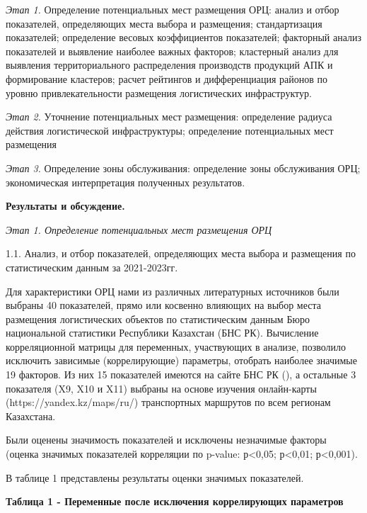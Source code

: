 \emph{Этап 1.} Определение потенциальных мест размещения ОРЦ: анализ и
отбор показателей, определяющих места выбора и размещения;
стандартизация показателей; определение весовых коэффициентов
показателей; факторный анализ показателей и выявление наиболее важных
факторов; кластерный анализ для выявления территориального распределения
производств продукций АПК и формирование кластеров; расчет рейтингов и
дифференциация районов по уровню привлекательности размещения
логистических инфраструктур.

\emph{Этап 2.} Уточнение потенциальных мест размещения: определение
радиуса действия логистической инфраструктуры; определение потенциальных
мест размещения

\emph{Этап 3.} Определение зоны обслуживания: определение зоны
обслуживания ОРЦ; экономическая интерпретация полученных результатов.

{\bfseries Результаты и обсуждение.}

\emph{Этап 1. Определение потенциальных мест размещения ОРЦ}

1.1. Анализ, и отбор показателей, определяющих места выбора и размещения
по статистическим данным за 2021-2023гг.

Для характеристики ОРЦ нами из различных литературных источников были
выбраны 40 показателей, прямо или косвенно влияющих на выбор места
размещения логистических объектов по статистическим данным Бюро
национальной статистики Республики Казахстан (БНС РК). Вычисление
корреляционной матрицы для переменных, участвующих в анализе, позволило
исключить зависимые (коррелирующие) параметры, отобрать наиболее
значимые 19 факторов. Из них 15 показателей имеются на сайте БНС РК
(\href{https://stat.gov.kz/en/}{}), а
остальные 3 показателя (X9, X10 и X11) выбраны на основе изучения
онлайн-карты (https://yandex.kz/maps/ru/) транспортных маршрутов по всем
регионам Казахстана.

Были оценены значимость показателей и исключены незначимые факторы
(оценка значимых показателей корреляции по p-value: р\textless0,05;
р\textless0,01; р\textless0,001).

В таблице 1 представлены результаты оценки значимых показателей.

{\bfseries Таблица 1 - Переменные после исключения коррелирующих
параметров}

